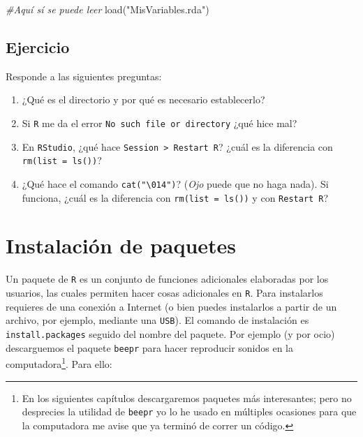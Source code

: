 \documentclass[
]{book}
\newenvironment{Shaded}{\begin{snugshade}}{\end{snugshade}}
\newcommand{\CommentTok}[1]{\textcolor[rgb]{0.56,0.35,0.01}{\textit{#1}}}
\newcommand{\FunctionTok}[1]{\textcolor[rgb]{0.00,0.00,0.00}{#1}}
\newcommand{\NormalTok}[1]{#1}
\newcommand{\StringTok}[1]{\textcolor[rgb]{0.31,0.60,0.02}{#1}}
\begin{document}
\begin{Shaded}
\begin{Highlighting}[]
\CommentTok{\#Aquí sí se puede leer}
\FunctionTok{load}\NormalTok{(}\StringTok{"MisVariables.rda"}\NormalTok{)}
\end{Highlighting}
\end{Shaded}

\hypertarget{ejercicio-13}{%
\subsection{Ejercicio}\label{ejercicio-13}}

Responde a las siguientes preguntas:

\begin{enumerate}
\def\labelenumi{\arabic{enumi}.}
\item
  ¿Qué es el directorio y por qué es necesario establecerlo?
\item
  Si \texttt{R} me da el error \texttt{\textquotesingle{}No\ such\ file\ or\ directory\textquotesingle{}} ¿qué hice mal?
\item
  En \texttt{RStudio}, ¿qué hace \texttt{Session\ \textgreater{}\ Restart\ R}? ¿cuál es la diferencia con \texttt{rm(list\ =\ ls())}?
\item
  ¿Qué hace el comando \texttt{cat("\textbackslash{}014")}? (\emph{Ojo} puede que no haga nada). Si funciona, ¿cuál es la diferencia con \texttt{rm(list\ =\ ls())} y con \texttt{Restart\ R}?
\end{enumerate}

\hypertarget{instalaciuxf3n-de-paquetes}{%
\section{Instalación de paquetes}\label{instalaciuxf3n-de-paquetes}}

Un paquete de \texttt{R} es un conjunto de funciones adicionales elaboradas por los usuarios, las cuales permiten hacer cosas adicionales en \texttt{R}. Para instalarlos requieres de una conexión a Internet (o bien puedes instalarlos a partir de un archivo, por ejemplo, mediante una \texttt{USB}). El comando de instalación es \texttt{install.packages} seguido del nombre del paquete. Por ejemplo (y por ocio) descarguemos el paquete \texttt{beepr} para hacer reproducir sonidos en la computadora\footnote{En los siguientes capítulos descargaremos paquetes más interesantes; pero no desprecies la utilidad de \texttt{beepr} yo lo he usado en múltiples ocasiones para que la computadora me avise que ya terminó de correr un código.}. Para ello:
\end{document}
